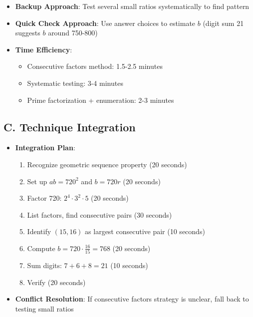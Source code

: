 \documentclass[11pt]{article}
\begin{document}
\begin{techniquesbox}
\begin{itemize}[leftmargin=*]
    \item \textbf{Backup Approach}: Test several small ratios systematically to find pattern
    
    \item \textbf{Quick Check Approach}: Use answer choices to estimate $b$ (digit sum 21 suggests $b$ around 750-800)
    
    \item \textbf{Time Efficiency}: 
    \begin{itemize}
        \item Consecutive factors method: 1.5-2.5 minutes
        \item Systematic testing: 3-4 minutes
        \item Prime factorization + enumeration: 2-3 minutes
    \end{itemize}
\end{itemize}

\subsection*{C. Technique Integration}
\begin{itemize}[leftmargin=*]
    \item \textbf{Integration Plan}:
    \begin{enumerate}
        \item Recognize geometric sequence property (20 seconds)
        \item Set up $ab = 720^2$ and $b = 720r$ (20 seconds)
        \item Factor 720: $2^4 \cdot 3^2 \cdot 5$ (20 seconds)
        \item List factors, find consecutive pairs (30 seconds)
        \item Identify $(15, 16)$ as largest consecutive pair (10 seconds)
        \item Compute $b = 720 \cdot \frac{16}{15} = 768$ (20 seconds)
        \item Sum digits: $7 + 6 + 8 = 21$ (10 seconds)
        \item Verify (20 seconds)
    \end{enumerate}
    
    \item \textbf{Conflict Resolution}: If consecutive factors strategy is unclear, fall back to testing small ratios
\end{itemize}
\end{techniquesbox}
\end{document}
